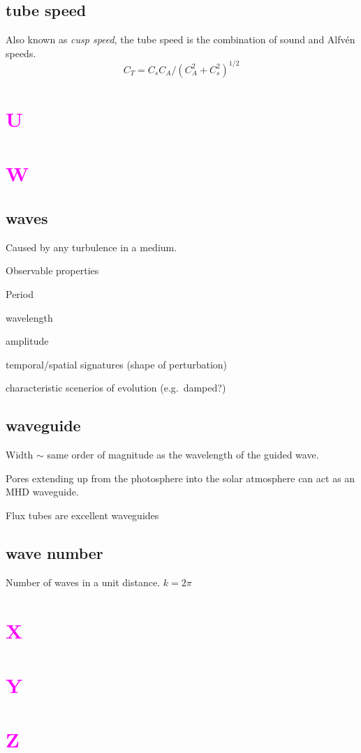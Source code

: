 \documentclass[12pt]{article}
\begin{document}
\subsection*{tube speed}
Also known as \emph{cusp speed}, the tube speed is the combination of sound
and Alfv\'en speeds.
$$ C_T = C_sC_A/(C_A^2 + C_s^2)^{1/2} $$

\section*{\textcolor{magenta}{U}}
\section*{\textcolor{magenta}{W}}

\subsection*{waves}
\begin{itemize*}
    \item Caused by any turbulence in a medium.
    \item Observable properties
        \begin{itemize*}
            \item Period
            \item wavelength
            \item amplitude
            \item temporal/spatial signatures (shape of perturbation)
            \item characteristic scenerios of evolution (e.g.\ damped?)
        \end{itemize*}
\end{itemize*}

\subsection*{waveguide}
\begin{itemize*}
    \item Width $\sim$ same order of magnitude as the wavelength of
        the guided wave.
    \item Pores extending up from the photosphere
        into the solar atmosphere can act as an
        MHD waveguide.
    \item Flux tubes are excellent waveguides
\end{itemize*}

\subsection*{wave number}
Number of waves in a unit distance.
$ k = 2\pi $

\section*{\textcolor{magenta}{X}}
\section*{\textcolor{magenta}{Y}}
\section*{\textcolor{magenta}{Z}}
\end{document}
